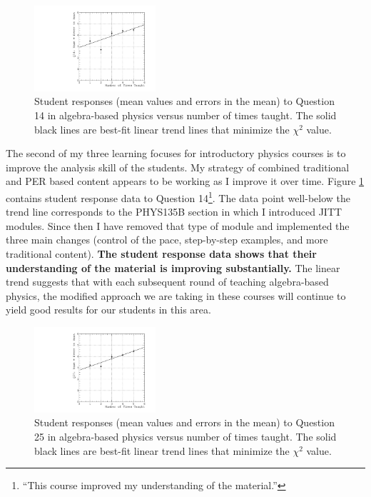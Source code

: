 \documentclass[../../main.tex]{subfiles}
\begin{document}
\begin{figure}
\centering
\includegraphics[width=0.4\textwidth]{Q14_algebra_based.pdf}
\caption{\label{fig:courses:intro_q14}  Student responses (mean values and errors in the mean) to Question 14 in algebra-based physics versus number of times taught.  The solid black lines are best-fit linear trend lines that minimize the $\chi^2$ value.}
\end{figure}

The second of my three learning focuses for introductory physics courses is to improve the analysis skill of the students.  My strategy of combined traditional and PER based content appears to be working as I improve it over time.  Figure \ref{fig:courses:intro_q14} contains student response data to Question 14\footnote{``This course  improved my understanding of the material.''}.  The data point well-below the trend line corresponds to the PHYS135B section in which I introduced JITT modules.  Since then I have removed that type of module and implemented the three main changes (control of the pace, step-by-step examples, and more traditional content).  \textbf{The student response data shows that their understanding of the material is improving substantially.}  The linear trend suggests that with each subsequent round of teaching algebra-based physics, the modified approach we are taking in these courses will continue to yield good results for our students in this area.  \\ \hspace{0.1cm}

\begin{figure}
\centering
\includegraphics[width=0.4\textwidth]{Q25_algebra_based.pdf}
\caption{\label{fig:courses:intro_q25}  Student responses (mean values and errors in the mean) to Question 25 in algebra-based physics versus number of times taught.  The solid black lines are best-fit linear trend lines that minimize the $\chi^2$ value.}
\end{figure}
\end{document}
